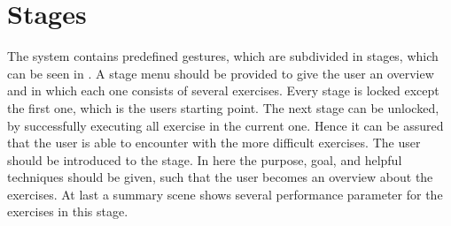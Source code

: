 \section{Stages}\label{4_4_stages}
The system contains predefined gestures, which are subdivided in stages, which can be seen in \textbf{}. A stage menu should be provided to give the user an overview and in which each one consists of several exercises. Every stage is locked except the first one, which is the users starting point. The next stage can be unlocked, by successfully executing all exercise in the current one. Hence it can be assured that the user is able to encounter with the more difficult exercises. The user should be introduced to the stage. In here the purpose, goal, and helpful techniques should be given, such that the user becomes an overview about the exercises. At last a summary scene shows several performance parameter for the exercises in this stage.

